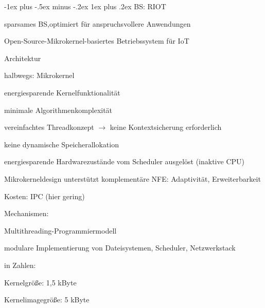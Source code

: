 \documentclass[a4paper]{article}
\makeatletter
\renewcommand{\subsubsection}{\@startsection{subsubsection}{3}{0mm}%
 {-1ex plus -.5ex minus -.2ex}%
 {1ex plus .2ex}%
 {\normalfont\small\bfseries}}
\makeatother
\begin{document}
\begin{multicols}{3}
    \subsubsection{BS: RIOT}
    \begin{itemize*}
        \item sparsames BS,optimiert für anspruchsvollere Anwendungen
        \item Open-Source-Mikrokernel-basiertes Betriebssystem für IoT
        \item Architektur
        \begin{itemize*}
            \item halbwegs: Mikrokernel
            \item energiesparende Kernelfunktionalität
            \begin{itemize*}
                \item minimale Algorithmenkomplexität
                \item vereinfachtes Threadkonzept $\rightarrow$ keine Kontextsicherung erforderlich
                \item keine dynamische Speicherallokation
                \item energiesparende Hardwarezustände vom Scheduler ausgelöst (inaktive CPU)
            \end{itemize*}
            \item Mikrokerneldesign unterstützt komplementäre NFE: Adaptivität, Erweiterbarkeit
            \item Kosten: IPC (hier gering)
        \end{itemize*}
        \item Mechanismen:
        \begin{itemize*}
            \item Multithreading-Programmiermodell
            \item modulare Implementierung von Dateisystemen, Scheduler, Netzwerkstack
        \end{itemize*}
        \item in Zahlen:
        \begin{itemize*}
            \item Kernelgröße: 1,5 kByte
            \item Kernelimagegröße: 5 kByte
        \end{itemize*}
    \end{itemize*}


\end{multicols}
\end{document}
